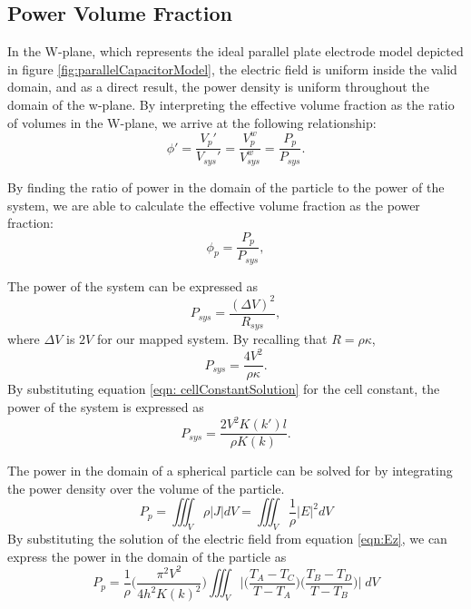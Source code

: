\subsection*{Power Volume Fraction}
\par In the W-plane, which represents the ideal parallel plate electrode model depicted in figure \ref{fig:parallelCapacitorModel}, the electric field is uniform inside the valid domain, and as a direct result, the power density is uniform throughout the domain of the w-plane. By interpreting the effective volume fraction as the ratio of volumes in the W-plane, we arrive at the following relationship:
\begin{equation}
    \phi ' = \frac{V_p'}{V_{sys}'} = \frac{V^w_p}{V^w_{sys}} = \frac{P_p}{P_{sys}}.
    \label{eqn: effectiveVolumeFractions}
\end{equation}

\par By finding the ratio of power in the domain of the particle to the power of the system, we are able to calculate the effective volume fraction as the power fraction:
\begin{equation}
    \phi_p = \frac{P_p}{P_{sys}},
    \label{eqn: powerVolumeFraction_initial}
\end{equation}

\noindent The power of the system can be expressed as
\begin{equation}
    P_{sys} = \frac{(\Delta V)^2}{R_{sys}},
\end{equation}
\noindent where $\Delta V$ is $2V$ for our mapped system. By recalling that $R=\rho\kappa$,
\begin{equation}
    P_{sys} = \frac{4V^2}{\rho\kappa}.
\end{equation}
\noindent By substituting equation \ref{eqn: cellConstantSolution} for the cell constant, the power of the system is expressed as 
\begin{equation}
    P_{sys} = \frac{2V^2K(k')l}{\rho K(k)}.
    \label{eqn: powerSystem}
\end{equation}

\par The power in the domain of a spherical particle can be solved for by integrating the power density over the volume of the particle.
\begin{equation}
    P_p = \iiint_V \rho \big| J \big| dV = \iiint_V \frac{1}{\rho} \big| E \big|^2 dV
\end{equation}
\noindent By substituting the solution of the electric field from equation \ref{eqn:Ez}, we can express the power in the domain of the particle as
\begin{equation}
    P_p = \frac{1}{\rho}\bigg(\frac{\pi^2 V^2}{4h^2K(k)^2}\bigg)\iiint_V \bigg|\bigg(\frac{T_A-T_C}{T-T_A}\bigg)\bigg(\frac{T_B-T_D}{T-T_B}\bigg)\bigg| \;dV
    \label{eqn: powerParticle}
\end{equation}

